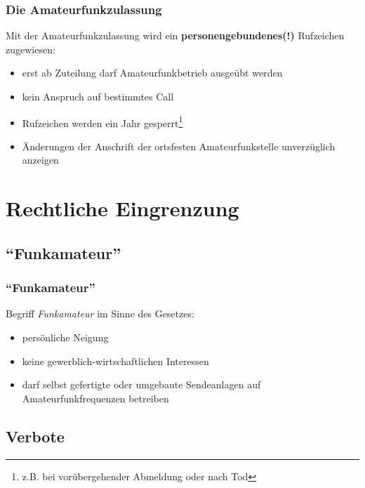 \begin{frame}
    \frametitle{Die Amateurfunkzulassung}

    Mit der Amateurfunkzulassung wird ein \textbf{personengebundenes(!)}
    Rufzeichen zugewiesen:

    \begin{itemize}
        \item erst ab Zuteilung darf Amateurfunkbetrieb ausgeübt werden
        \item kein Anspruch auf bestimmtes Call
        \item Rufzeichen werden ein Jahr gesperrt\footnote{z.B. bei
              vorübergehender Abmeldung oder nach Tod}
        \item Änderungen der Anschrift der ortsfesten Amateurfunkstelle
              unverzüglich anzeigen
    \end{itemize}

\end{frame}

\section{Rechtliche Eingrenzung}

\subsection{``Funkamateur''}

\begin{frame}
    \frametitle{``Funkamateur''}

    Begriff \emph{Funkamateur} im Sinne des Gesetzes:

    \begin{itemize}
        \item persönliche Neigung
        \item keine gewerblich-wirtschaftlichen Interessen
        \item darf selbst gefertigte oder umgebaute Sendeanlagen auf Amateurfunkfrequenzen betreiben
    \end{itemize}

\end{frame}

\subsection{Verbote}

